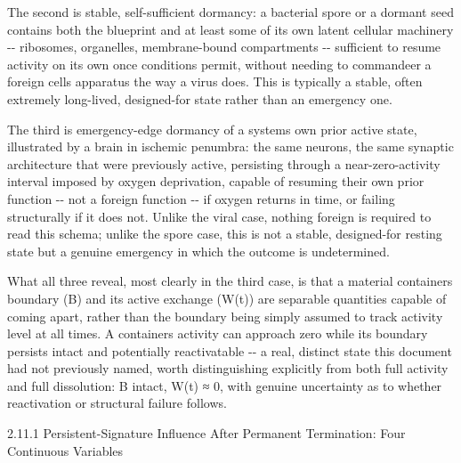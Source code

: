 \documentclass[
]{article}
\begin{document}
The second is stable, self-sufficient dormancy: a bacterial spore or a
dormant seed contains both the blueprint and at least some of its own
latent cellular machinery -\/- ribosomes, organelles, membrane-bound
compartments -\/- sufficient to resume activity on its own once
conditions permit, without needing to commandeer a foreign cells
apparatus the way a virus does. This is typically a stable, often
extremely long-lived, designed-for state rather than an emergency one.

The third is emergency-edge dormancy of a systems own prior active
state, illustrated by a brain in ischemic penumbra: the same neurons,
the same synaptic architecture that were previously active, persisting
through a near-zero-activity interval imposed by oxygen deprivation,
capable of resuming their own prior function -\/- not a foreign function
-\/- if oxygen returns in time, or failing structurally if it does not.
Unlike the viral case, nothing foreign is required to read this schema;
unlike the spore case, this is not a stable, designed-for resting state
but a genuine emergency in which the outcome is undetermined.

What all three reveal, most clearly in the third case, is that a
material containers boundary (B) and its active exchange (W(t)) are
separable quantities capable of coming apart, rather than the boundary
being simply assumed to track activity level at all times. A containers
activity can approach zero while its boundary persists intact and
potentially reactivatable -\/- a real, distinct state this document had
not previously named, worth distinguishing explicitly from both full
activity and full dissolution: B intact, W(t) ≈ 0, with genuine
uncertainty as to whether reactivation or structural failure follows.

2.11.1 Persistent-Signature Influence After Permanent Termination: Four
Continuous Variables
\end{document}
